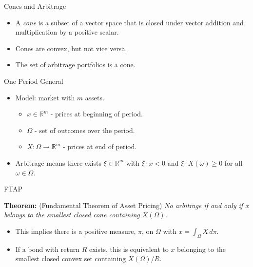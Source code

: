 \documentclass[pdf,colorBG,slideColor,blends]{prosper}
\newcommand{\RR}{\mathbb{R}}
\begin{document}
\begin{slide}{Cones and Arbitrage}

\begin{itemize}

\item A {\em cone} is a subset of a vector space that is closed under
vector addition and multiplication by a positive scalar.

\item Cones are convex, but not vice versa.

\item The set of arbitrage portfolios is a cone.

\end{itemize}

\end{slide}

\begin{slide}{One Period General}

\begin{itemize}

\item Model: market with $m$ assets.
\begin{itemize}

\item $x\in\RR^m$ - prices at beginning of period.

\item $\Omega$ - set of outcomes over the period.

\item $X\colon\Omega\to\RR^m$ - prices at end of period.

\end{itemize}

\item Arbitrage means there exists $\xi\in\RR^m$ with $\xi\cdot x < 0$
and $\xi\cdot X(\omega)\ge0$ for all $\omega\in\Omega$.

\end{itemize}

\end{slide}

\begin{slide}{FTAP}

\medskip

{\bf Theorem:} {\rm (Fundamental Theorem of Asset Pricing)} {\it No arbitrage
if and only if $x$ belongs to the smallest closed cone containing
$X(\Omega)$.}

\medskip

\begin{itemize}

\item This implies there is a positive measure, $\pi$, on $\Omega$
with $x = \int_\Omega X\,d\pi$.

\item If a bond with return $R$ exists, this is equivalent to $x$
belonging to the smallest closed convex set containing $X(\Omega)/R$.

\end{itemize}

\end{slide}
\end{document}
